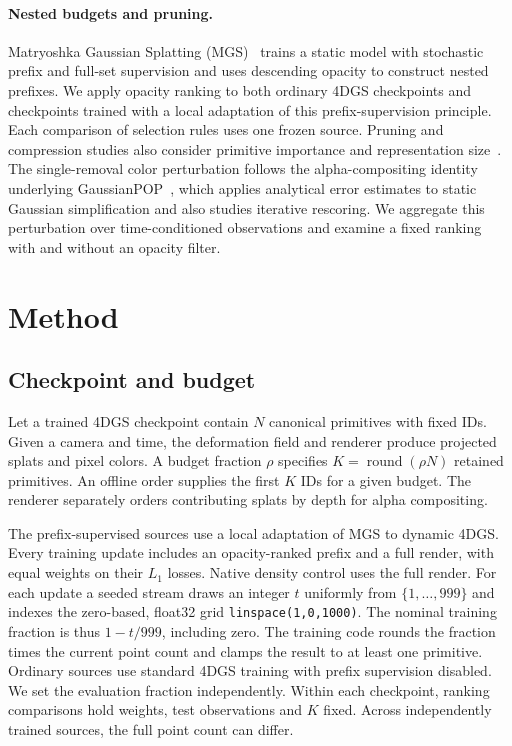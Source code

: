 \documentclass[pdflatex,sn-mathphys]{sn-jnl}
\makeatletter
\newcommand{\runinheading}[2]{\def\toclevel@paragraph{#1}\paragraph{#2}}
\makeatother
\begin{document}
\runinheading{2}{Nested budgets and pruning.}
Matryoshka Gaussian Splatting (MGS)~\cite{guo2026matryoshka} trains a static model with stochastic prefix and full-set supervision and uses descending opacity to construct nested prefixes. We apply opacity ranking to both ordinary 4DGS checkpoints and checkpoints trained with a local adaptation of this prefix-supervision principle. Each comparison of selection rules uses one frozen source. Pruning and compression studies also consider primitive importance and representation size~\cite{fan2024lightgaussian,niedermayr2024compressed,navaneet2024compgs}. The single-removal color perturbation follows the alpha-compositing identity underlying GaussianPOP~\cite{lee2026gaussianpop}, which applies analytical error estimates to static Gaussian simplification and also studies iterative rescoring. We aggregate this perturbation over time-conditioned observations and examine a fixed ranking with and without an opacity filter.

\section{Method}\label{sec:method}
\subsection{Checkpoint and budget}\label{sec:checkpoint}
Let a trained 4DGS checkpoint contain $N$ canonical primitives with fixed IDs. Given a camera and time, the deformation field and renderer produce projected splats and pixel colors. A budget fraction $\rho$ specifies $K=\operatorname{round}(\rho N)$ retained primitives. An offline order supplies the first $K$ IDs for a given budget. The renderer separately orders contributing splats by depth for alpha compositing.

The prefix-supervised sources use a local adaptation of MGS to dynamic 4DGS. Every training update includes an opacity-ranked prefix and a full render, with equal weights on their $L_1$ losses. Native density control uses the full render. For each update a seeded stream draws an integer $t$ uniformly from $\{1,\ldots,999\}$ and indexes the zero-based, float32 grid \texttt{linspace(1,0,1000)}. The nominal training fraction is thus $1-t/999$, including zero. The training code rounds the fraction times the current point count and clamps the result to at least one primitive. Ordinary sources use standard 4DGS training with prefix supervision disabled. We set the evaluation fraction independently. Within each checkpoint, ranking comparisons hold weights, test observations and $K$ fixed. Across independently trained sources, the full point count can differ.
\end{document}
